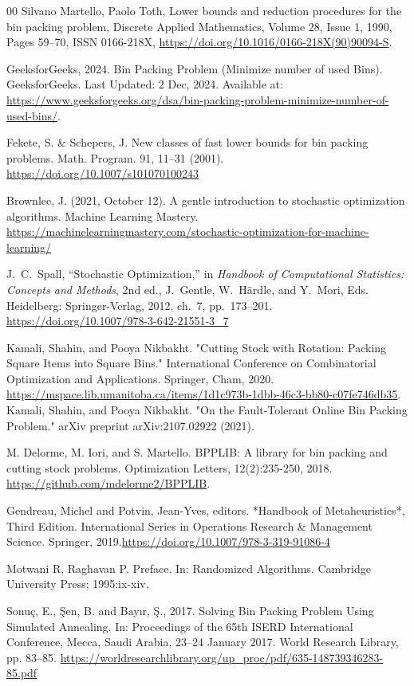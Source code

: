 \documentclass[12pt]{article}
\begin{document}
\begin{thebibliography}{00}
 Silvano Martello, Paolo Toth, Lower bounds and reduction procedures for the bin packing problem, Discrete Applied Mathematics, Volume 28, Issue 1, 1990, Pages 59--70, ISSN 0166-218X, \url{https://doi.org/10.1016/0166-218X(90)90094-S}.

 GeeksforGeeks, 2024. Bin Packing Problem (Minimize number of used Bins). GeeksforGeeks. Last Updated: 2 Dec, 2024. Available at: \url{https://www.geeksforgeeks.org/dsa/bin-packing-problem-minimize-number-of-used-bins/}.

 Fekete, S. \& Schepers, J. New classes of fast lower bounds for bin packing problems. Math. Program. 91, 11--31 (2001). \url{https://doi.org/10.1007/s101070100243} 

 Brownlee, J. (2021, October 12). A gentle introduction to stochastic optimization algorithms. Machine Learning Mastery. \url{https://machinelearningmastery.com/stochastic-optimization-for-machine-learning/}

 J.~C.~Spall, ``Stochastic Optimization,'' in \emph{Handbook of Computational Statistics: Concepts and Methods}, 2nd ed., J.~Gentle, W.~Härdle, and Y.~Mori, Eds. Heidelberg: Springer-Verlag, 2012, ch.~7, pp.~173--201. \url{https://doi.org/10.1007/978-3-642-21551-3_7}

 Kamali, Shahin, and Pooya Nikbakht. "Cutting Stock with Rotation: Packing Square Items into Square Bins." International Conference on Combinatorial Optimization and Applications. Springer, Cham, 2020. \url{https://mspace.lib.umanitoba.ca/items/1d1c973b-1dbb-46c3-bb80-c07fe746db35}. Kamali, Shahin, and Pooya Nikbakht. "On the Fault-Tolerant Online Bin Packing Problem." arXiv preprint arXiv:2107.02922 (2021). 

 M. Delorme, M. Iori, and S. Martello. BPPLIB: A library for bin packing and cutting stock problems. Optimization Letters, 12(2):235-250, 2018. \url{https://github.com/mdelorme2/BPPLIB}.

 Gendreau, Michel and Potvin, Jean-Yves, editors. *Handbook of Metaheuristics*, Third Edition. International Series in Operations Research \& Management Science. Springer, 2019.\url{https://doi.org/10.1007/978-3-319-91086-4}

 Motwani R, Raghavan P. Preface. In: Randomized Algorithms. Cambridge University Press; 1995:ix-xiv.

 Sonuç, E., Şen, B. and Bayır, Ş., 2017. Solving Bin Packing Problem Using Simulated Annealing. In: Proceedings of the 65th ISERD International Conference, Mecca, Saudi Arabia, 23–24 January 2017. World Research Library, pp. 83–85. \url{https://worldresearchlibrary.org/up\_proc/pdf/635-148739346283-85.pdf}


\end{thebibliography}
\end{document}
